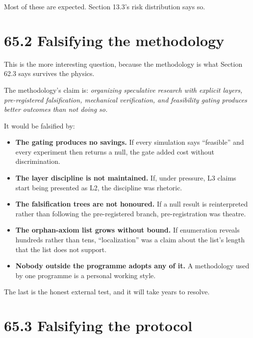 \documentclass[
  11pt]{report}
\providecommand{\tightlist}{%
  \setlength{\itemsep}{0pt}\setlength{\parskip}{0pt}}
\begin{document}
Most of these are expected. Section 13.3's risk distribution says so.

\hypertarget{falsifying-the-methodology}{%
\section{65.2 Falsifying the
methodology}\label{falsifying-the-methodology}}

This is the more interesting question, because the methodology is what
Section 62.3 says survives the physics.

The methodology's claim is: \emph{organizing speculative research with
explicit layers, pre-registered falsification, mechanical verification,
and feasibility gating produces better outcomes than not doing so.}

It would be falsified by:

\begin{itemize}
\tightlist
\item
  \textbf{The gating produces no savings.} If every simulation says
  ``feasible'' and every experiment then returns a null, the gate added
  cost without discrimination.
\item
  \textbf{The layer discipline is not maintained.} If, under pressure,
  L3 claims start being presented as L2, the discipline was rhetoric.
\item
  \textbf{The falsification trees are not honoured.} If a null result is
  reinterpreted rather than following the pre-registered branch,
  pre-registration was theatre.
\item
  \textbf{The orphan-axiom list grows without bound.} If enumeration
  reveals hundreds rather than tens, ``localization'' was a claim about
  the list's length that the list does not support.
\item
  \textbf{Nobody outside the programme adopts any of it.} A methodology
  used by one programme is a personal working style.
\end{itemize}

The last is the honest external test, and it will take years to resolve.

\hypertarget{falsifying-the-protocol}{%
\section{65.3 Falsifying the protocol}\label{falsifying-the-protocol}}
\end{document}

